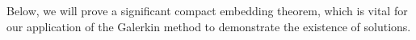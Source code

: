 \documentclass[11pt]{article}
\numberwithin{equation}{section}
\def\Om{\Omega}
\def\mcH{\mathcal{H}}
\begin{document}
		
		
		Below, we will prove a significant compact embedding theorem, which is vital for our application of the Galerkin method to demonstrate the existence of solutions.
		
\end{document}
